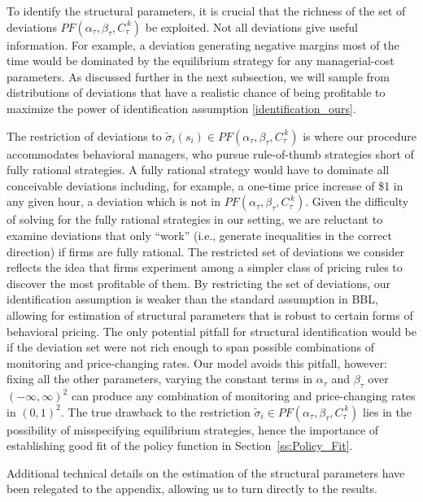 \documentclass[11pt]{article}
\newcommand{\cut}[1]{C_{\tau}^{\,#1}}
\begin{document}
\begin{spacing}{1.3}
To identify the structural parameters, it is crucial that the richness
of the set of deviations $PF(\alpha_{\tau},\beta_{\tau},\cut{k})$ be
exploited.  Not all deviations give useful information. For example, a
deviation generating negative margins most of the time would be
dominated by the equilibrium strategy for any managerial-cost
parameters. As discussed further in the next subsection, we will
sample from distributions of deviations that have a realistic chance
of being profitable to maximize the power of identification assumption
\eqref{identification_ours}.

The restriction of deviations to $\tilde{\sigma}_i(s_i) \in
PF(\alpha_{\tau},\beta_{\tau},\cut{k})$ is where our procedure
accommodates behavioral managers, who pursue rule-of-thumb strategies
short of fully rational strategies. A fully rational strategy would
have to dominate all conceivable deviations including, for example, a
one-time price increase of \$1 in any given hour, a deviation which is
not in $PF(\alpha_{\tau},\beta_{\tau},\cut{k})$. Given the difficulty
of solving for the fully rational strategies in our setting, we are
reluctant to examine deviations that only ``work'' (i.e., generate
inequalities in the correct direction) if firms are fully
rational. The restricted set of deviations we consider reflects the
idea that firms experiment among a simpler class of pricing rules to
discover the most profitable of them. By restricting the set of
deviations, our identification assumption is weaker than the standard
assumption in BBL, allowing for estimation of structural parameters
that is robust to certain forms of behavioral pricing. The only
potential pitfall for structural identification would be if the
deviation set were not rich enough to span possible combinations of
monitoring and price-changing rates. Our model avoids this pitfall,
however: fixing all the other parameters, varying the constant terms
in $\alpha_\tau$ and $\beta_\tau$ over $(-\infty, \infty)^2$ can
produce any combination of monitoring and price-changing rates in
$(0,1)^2$. The true drawback to the restriction $\tilde{\sigma}_i
\in PF(\alpha_{\tau},\beta_{\tau},\cut{k})$ lies in the possibility of
misspecifying equilibrium strategies, hence the importance of
establishing good fit of the policy function in
Section~\ref{ss:Policy_Fit}.

Additional technical details on the estimation of the structural
parameters have been relegated to the appendix, allowing us to turn
directly to the results.



\end{spacing}
\end{document}
